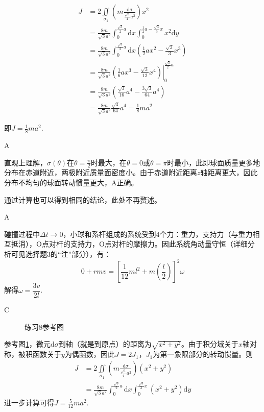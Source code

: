 \documentclass[b5paper,opensource,sourcefont,parskip]{qyxf-book}
\newcommand{\di}[1]{\mathrm{d}#1}
\newcommand{\zbj}[4]
{
	\draw (0,0) node[below left] {$ O $};
	\draw [->] (#1,0) -- (#2,0) node[right] {$ x $};
	\draw [->] (0,#3) -- (0,#4) node[right] {$ y $};
}
\begin{document}
\begin{align*}
J&=2\iint\limits_{\sigma_1}\left(m\frac{\di{\sigma}}{\frac{\sqrt{3}}{4}a^2}\right)x^2\\
&=\frac{8m}{\sqrt{3}a^2}\int_0^{\frac{\sqrt{3}}{2}a}\di{x}\int_0^{\frac{1}{2}a-\frac{\sqrt{3}}{3}x}x^2\di{y}\\
&=\frac{8m}{\sqrt{3}a^2}\int_0^{\frac{\sqrt{3}}{2}a}\di{x}\left(\frac{1}{2}ax^2-\frac{\sqrt{3}}{3}x^3\right)\\
&=\frac{8m}{\sqrt{3}a^2}\left.\left(\frac{1}{6}ax^3-\frac{\sqrt{3}}{12}x^4\right)\right|_0^{\frac{\sqrt{3}}{2}a}\\
&=\frac{8m}{\sqrt{3}a^2}\left(\frac{\sqrt{3}}{16}a^4-\frac{3\sqrt{3}}{64}a^4\right)\\
&=\frac{8m}{\sqrt{3}a^2}\frac{\sqrt{3}}{64}a^4=\frac{1}{8}ma^2
\end{align*}

即$ J=\frac{1}{8}ma^2 $.

A

\solve 直观上理解，$ \sigma(\theta) $在$ \theta=\frac{\pi}{2} $时最大，在$ \theta=0 $或$ \theta=\pi $时最小，此即球面质量更多地分布在赤道附近，两极附近质量面密度小。由于赤道附近距离$ z $轴距离更大，因此分布不均匀的球面转动惯量更大，A正确。\par
通过计算也可以得到相同的结论，此处不再赘述。

A

\solve 碰撞过程中$ \Delta t\to 0 $，小球和系杆组成的系统受到4个力：重力，支持力（与重力相互抵消），O点对杆的支持力，O点对杆的摩擦力。因此系统角动量守恒（详细分析可见选择题3的“注”部分），有：
\[0+rmv=\left[\frac{1}{12}ml^2+m\left(\frac{l}{2}\right)\right]^2\omega\]
解得$\omega=\dfrac{3v}{2l}$.
		
C

\begin{figure}[htbp]
\centering
{}
\caption{练习8参考图}\label{fig:c4-t8}
\end{figure}

\solve 参考图\ref{fig:c4-t8}，微元$ \di{\sigma} $到轴（就是到原点）的距离为$ \sqrt{x^2+y^2} $。由于积分域关于$ x $轴对称，被积函数关于$ y $为偶函数，因此$ J=2J_1 $，$ J_1 $为第一象限部分的转动惯量。则
\begin{align*}
J&=2\iint\limits_{\sigma_1}\left(m\frac{\di{\sigma}}{\frac{\sqrt{3}}{4}a^2}\right)(x^2+y^2)\\
&=\frac{8m}{\sqrt{3}a^2}\int_0^{\frac{\sqrt{3}}{2}a}\di{x}\int_0^{\frac{\sqrt{3}}{3}x}(x^2+y^2)\di{y}
\end{align*}
进一步计算可得$ J=\frac{5}{12}ma^2 $.
\end{document}
